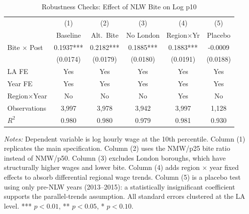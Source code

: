 \begin{table}[htbp]
\centering
\caption{Robustness Checks: Effect of NLW Bite on Log p10}
\label{tab:robustness}
\small
\begin{tabular}{lccccc}
\hline\hline
 & (1) & (2) & (3) & (4) & (5) \\
 & Baseline & Alt.\ Bite & No London & Region$\times$Yr & Placebo \\
\hline
Bite $\times$ Post & 0.1937*** & 0.2182*** & 0.1885*** & 0.1883*** & -0.0009 \\
 & (0.0174) & (0.0179) & (0.0180) & (0.0191) & (0.0188) \\
\hline
LA FE          & Yes & Yes & Yes & Yes & Yes \\
Year FE        & Yes & Yes & Yes & Yes & Yes \\
Region$\times$Year & No & No & No & Yes & No \\
Observations & 3,997 & 3,978 & 3,942 & 3,997 & 1,128 \\
$R^2$        & 0.980 & 0.980 & 0.979 & 0.981 & 0.930 \\
\hline\hline
\end{tabular}
\raggedright\footnotesize\textit{Notes:} Dependent variable is log hourly wage at the 10th percentile. Column (1) replicates the main specification. Column (2) uses the NMW/p25 bite ratio instead of NMW/p50. Column (3) excludes London boroughs, which have structurally higher wages and lower bite. Column (4) adds region $\times$ year fixed effects to absorb differential regional wage trends. Column (5) is a placebo test using only pre-NLW years (2013--2015): a statistically insignificant coefficient supports the parallel-trends assumption. All standard errors clustered at the LA level. *** $p<0.01$, ** $p<0.05$, * $p<0.10$.
\end{table}
